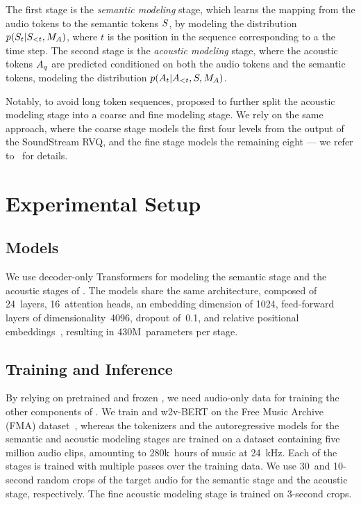 The first stage is the \emph{semantic modeling} stage, which learns the mapping from the {\mulan} audio tokens to the semantic tokens $S$, by modeling the distribution $p(S_t\vert S_{<t},M_A)$, where $t$ is the position in the sequence corresponding to a the time step. 
The second stage is the \emph{acoustic modeling} stage, where the acoustic tokens $A_q$ are predicted conditioned on both the {\mulan} audio tokens and the semantic tokens, modeling the distribution $p(A_t\vert A_{<t},S, M_A)$.

Notably, to avoid long token sequences, {\audiolm} proposed to further split the acoustic modeling stage into a coarse and fine modeling stage. We rely on the same approach, where the coarse stage models the first four levels from the output of the SoundStream RVQ, and the fine stage models the remaining eight --- we refer to~\citet{audiolm} for details.
\section{Experimental Setup}
\label{sec:exp-setup}

\subsection{Models}
We use decoder-only Transformers for modeling the semantic stage and the acoustic stages of {\audiolm}.
The models share the same architecture, composed of 24~layers, 16~attention heads, an embedding dimension of 1024, feed-forward layers of dimensionality~4096, dropout of~0.1, and relative positional embeddings~\cite{t5}, resulting in 430M~parameters per stage. 

\subsection{Training and Inference}

By relying on pretrained and frozen {\mulan}, we need audio-only data for training the other components of {\model}. We train {\soundstream} and w2v-BERT on the Free Music Archive (FMA) dataset~\cite{fma}, whereas the tokenizers and the autoregressive models for the semantic and acoustic modeling stages are trained on a dataset containing five million audio clips, amounting to 280k~hours of music at 24~kHz. Each of the stages is trained with multiple passes over the training data. We use 30~and 10-second random crops of the target audio for the semantic stage and the acoustic stage, respectively. The {\audiolm} fine acoustic modeling stage is trained on 3-second crops.

